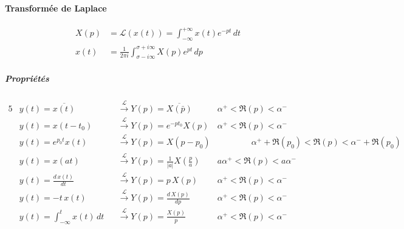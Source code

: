 \paragraph{Transformée de Laplace} \begin{align*}X(p) &=\mathcal{L}(x(t))=\int_{-\infty}^ {+\infty}x(t)e^ {-pt}\,dt\\
x(t) &= \frac{1}{2\pi i}\int_{\sigma-i\infty}^ {\sigma+i\infty}X(p)e^{pt}\,dp
\end{align*}
\subparagraph{Propriétés} \begin{alignat*}{5}
& y(t)=\overline{x(t)} &&\overset{\mathcal{L}}{\rightarrow} Y(p)=\overline{X(\bar{p})} & \alpha^+<\Re(p)<\alpha^-\\
& y(t)=x(t-t_0) &&\overset{\mathcal{L}}{\rightarrow} Y(p)=e^{-pt_0}X(p) & \alpha^+<\Re(p)<\alpha^- \\
& y(t)=e^{p_0t}x(t) &&\overset{\mathcal{L}}{\rightarrow} Y(p)= X(p-p_0) & \qquad\qquad\alpha^++\Re(p_0)<\Re(p)<\alpha^-+\Re(p_0)\\
& y(t)=x(at) &&\overset{\mathcal{L}}{\rightarrow} Y(p) = \frac{1}{|a|}X\left(\frac{p}{a}\right) & a\alpha^+<\Re(p)<a\alpha^-\\
& y(t)=\frac{d\,x(t)}{dt} &&\overset{\mathcal{L}}{\rightarrow} Y(p) =p\,X(p) & \alpha^+<\Re(p)<\alpha^-\\
& y(t)=-t\,x(t) &&\overset{\mathcal{L}}{\rightarrow}  Y(p)=\frac{d\,X(p)}{dp} & \alpha^+<\Re(p)<\alpha^-\\
& y(t)=\int_{-\infty}^t x(t)\,dt &&\overset{\mathcal{L}}{\rightarrow}  Y(p)=\frac{X(p)}{p} &  \alpha^+<\Re(p)<\alpha^-
\end{alignat*}
